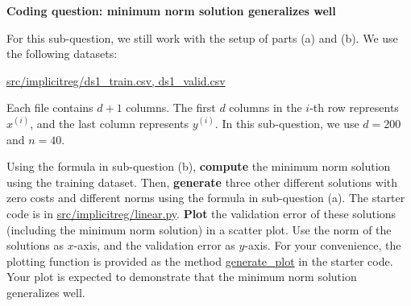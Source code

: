 \item{} 
\textbf{Coding question: minimum norm solution generalizes well}

For this sub-question, we still work with the setup of parts (a) and (b). We use the following datasets:
\begin{center}
	\url{src/implicitreg/ds1_train.csv, ds1_valid.csv}
\end{center}
Each file contains $d+1$ columns. The first $d$ columns in the $i$-th row represents $x^{(i)}$, and the last column represents $y^{(i)}.$ In this sub-question, we use $d=200$ and $n=40$.

Using the formula in sub-question (b), \textbf{compute} the minimum norm solution using the training dataset. Then, \textbf{generate} three other different solutions with zero costs and different norms using the formula in sub-question (a).
The starter code is in \url{src/implicitreg/linear.py}. \textbf{Plot} the validation error of these solutions (including the minimum norm solution) in a scatter plot. 
Use the norm of the solutions as $x$-axis, and the validation error as $y$-axis. For your convenience, the plotting function is provided as the method \url{generate_plot} in the starter code. 
Your plot is expected to demonstrate that the minimum norm solution generalizes well.